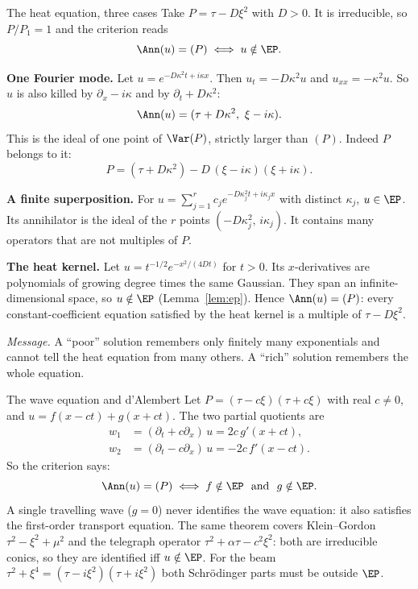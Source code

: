 \begin{example}{The heat equation, three cases}\label{ex:heat3}
Take $P=\tau-D\xi^2$ with $D>0$. It is irreducible, so $P/P_1=1$ and the criterion reads
\[
\Ann(u)=(P)\iff u\notin\EP .
\]

\textbf{One Fourier mode.} Let $u=e^{-D\kappa^2t+i\kappa x}$. Then $u_t=-D\kappa^2u$ and $u_{xx}=-\kappa^2u$. So $u$ is also killed by $\partial_x-i\kappa$ and by $\partial_t+D\kappa^2$:
\[
\Ann(u)=(\tau+D\kappa^2,\ \xi-i\kappa).
\]
This is the ideal of one point of $\Var(P)$, strictly larger than $(P)$. Indeed $P$ belongs to it:
\[
P=(\tau+D\kappa^2)-D\,(\xi-i\kappa)(\xi+i\kappa).
\]

\textbf{A finite superposition.} For $u=\sum_{j=1}^rc_je^{-D\kappa_j^2t+i\kappa_jx}$ with distinct $\kappa_j$, $u\in\EP$. Its annihilator is the ideal of the $r$ points $(-D\kappa_j^2,\,i\kappa_j)$. It contains many operators that are not multiples of $P$.

\textbf{The heat kernel.} Let $u=t^{-1/2}e^{-x^2/(4Dt)}$ for $t>0$. Its $x$-derivatives are polynomials of growing degree times the same Gaussian. They span an infinite-dimensional space, so $u\notin\EP$ (Lemma~\ref{lem:ep}). Hence $\Ann(u)=(P)$: every constant-coefficient equation satisfied by the heat kernel is a multiple of $\tau-D\xi^2$.

\emph{Message.} A ``poor'' solution remembers only finitely many exponentials and cannot tell the heat equation from many others. A ``rich'' solution remembers the whole equation.
\end{example}

\begin{example}{The wave equation and d'Alembert  \proved}\label{ex:wave-ident}
Let $P=(\tau-c\xi)(\tau+c\xi)$ with real $c\ne0$, and $u=f(x-ct)+g(x+ct)$. The two partial quotients are
\begin{align*}
w_1&=(\partial_t+c\partial_x)\,u=2c\,g'(x+ct),\\
w_2&=(\partial_t-c\partial_x)\,u=-2c\,f'(x-ct).
\end{align*}
So the criterion says:
\[
\Ann(u)=(P)\iff f\notin\EP\ \text{ and }\ g\notin\EP .
\]
A single travelling wave ($g=0$) never identifies the wave equation: it also satisfies the first-order transport equation. The same theorem covers Klein--Gordon $\tau^2-\xi^2+\mu^2$ and the telegraph operator $\tau^2+\alpha\tau-c^2\xi^2$: both are irreducible conics, so they are identified iff $u\notin\EP$. For the beam $\tau^2+\xi^4=(\tau-i\xi^2)(\tau+i\xi^2)$ both Schr\"odinger parts must be outside $\EP$.

\end{example}

